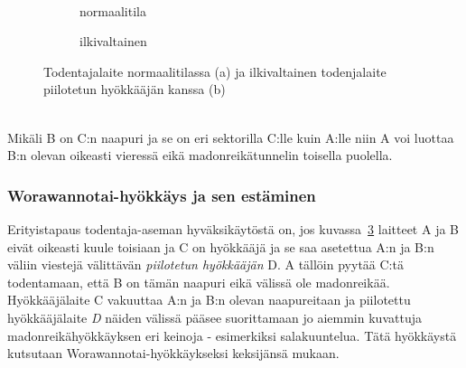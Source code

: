 \documentclass[finnish]{tktltiki2}
\theoremstyle{definition}
\theoremstyle{remark}
\begin{document}
\noindent\\
\begin{figure}[h]
	\begin{subfigure}{.5\textwidth}
		\centering
		\caption{normaalitila}
		\label{fig:todentaja1}
	\end{subfigure}%
	\begin{subfigure}{.5\textwidth}
		\centering
		\caption{ilkivaltainen}
		\label{fig:todentaja2}
	\end{subfigure}%
	\caption{Todentajalaite normaalitilassa (a) ja ilkivaltainen todenjalaite piilotetun hyökkääjän kanssa (b)}
	\label{fig:todentajalaitteet}
\end{figure}
\noindent\\
Mikäli B on C:n naapuri ja se on eri sektorilla C:lle kuin A:lle niin A voi luottaa B:n olevan oikeasti vieressä eikä madonreikätunnelin toisella puolella.

\subsubsection{Worawannotai-hyökkäys ja sen estäminen}

Erityistapaus todentaja-aseman hyväksikäytöstä on, jos kuvassa~\ref{fig:todentajalaitteet} laitteet A ja B eivät oikeasti kuule toisiaan ja C on hyökkääjä ja se saa asetettua A:n ja B:n väliin viestejä välittävän \emph{piilotetun hyökkääjän} D. A tällöin pyytää C:tä todentamaan, että B on tämän naapuri eikä välissä ole madonreikää. Hyökkääjälaite C vakuuttaa A:n ja B:n olevan naapureitaan ja piilotettu hyökkääjälaite \emph{D} näiden välissä pääsee suorittamaan jo aiemmin kuvattuja madonreikähyökkäyksen eri keinoja - esimerkiksi salakuuntelua. Tätä hyökkäystä kutsutaan Worawannotai-hyökkäykseksi keksijänsä mukaan.
\end{document}
